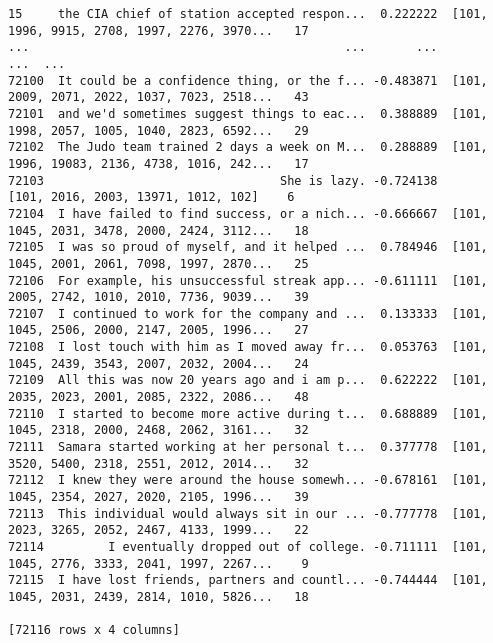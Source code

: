 \documentclass[a4paper,10pt,onecolumn,oneside,openright]{article}
\begin{document}
\begin{verbatim}
15     the CIA chief of station accepted respon...  0.222222  [101, 1996, 9915, 2708, 1997, 2276, 3970...   17
...                                            ...       ...                                          ...  ...
72100  It could be a confidence thing, or the f... -0.483871  [101, 2009, 2071, 2022, 1037, 7023, 2518...   43
72101  and we'd sometimes suggest things to eac...  0.388889  [101, 1998, 2057, 1005, 1040, 2823, 6592...   29
72102  The Judo team trained 2 days a week on M...  0.288889  [101, 1996, 19083, 2136, 4738, 1016, 242...   17
72103                                 She is lazy. -0.724138          [101, 2016, 2003, 13971, 1012, 102]    6
72104  I have failed to find success, or a nich... -0.666667  [101, 1045, 2031, 3478, 2000, 2424, 3112...   18
72105  I was so proud of myself, and it helped ...  0.784946  [101, 1045, 2001, 2061, 7098, 1997, 2870...   25
72106  For example, his unsuccessful streak app... -0.611111  [101, 2005, 2742, 1010, 2010, 7736, 9039...   39
72107  I continued to work for the company and ...  0.133333  [101, 1045, 2506, 2000, 2147, 2005, 1996...   27
72108  I lost touch with him as I moved away fr...  0.053763  [101, 1045, 2439, 3543, 2007, 2032, 2004...   24
72109  All this was now 20 years ago and i am p...  0.622222  [101, 2035, 2023, 2001, 2085, 2322, 2086...   48
72110  I started to become more active during t...  0.688889  [101, 1045, 2318, 2000, 2468, 2062, 3161...   32
72111  Samara started working at her personal t...  0.377778  [101, 3520, 5400, 2318, 2551, 2012, 2014...   32
72112  I knew they were around the house somewh... -0.678161  [101, 1045, 2354, 2027, 2020, 2105, 1996...   39
72113  This individual would always sit in our ... -0.777778  [101, 2023, 3265, 2052, 2467, 4133, 1999...   22
72114         I eventually dropped out of college. -0.711111  [101, 1045, 2776, 3333, 2041, 1997, 2267...    9
72115  I have lost friends, partners and countl... -0.744444  [101, 1045, 2031, 2439, 2814, 1010, 5826...   18

[72116 rows x 4 columns]
\end{verbatim}
\end{document}

